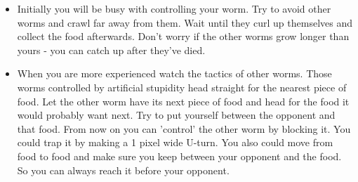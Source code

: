 \begin{itemize}

\item Initially you will be busy with controlling your worm. Try to
avoid other worms and crawl far away from them. Wait until they curl up
themselves and collect the food afterwards. Don't worry if the other
worms grow longer than yours {}- you can catch up after they've died. 

\item When you are more experienced watch the tactics of other worms.
Those worms controlled by artificial stupidity head straight for the
nearest piece of food. Let the other worm have its next piece of food
and head for the food it would probably want next. Try to put yourself
between the opponent and that food. From now on you can 'control' the
other worm by blocking it. You could trap it by making a 1 pixel wide
U{}-turn. You also could move from food to food and make sure you keep
between your opponent and the food. So you can always reach it before
your opponent. 

\end{itemize}
